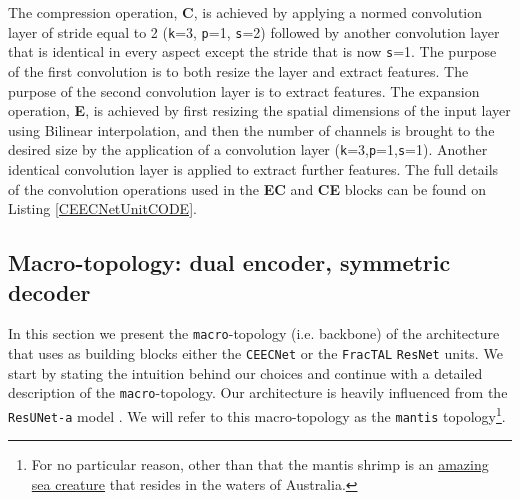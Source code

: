 \documentclass[times, 5p]{elsarticle}
\def \FracTAL {\texttt{FracTAL} }
\newcommand{\ceecnet}{\texttt{CEECNet}}
\begin{document}
The compression operation, \textbf{C}, is achieved by applying a normed convolution layer of stride equal to 2 (\texttt{k}=3, \texttt{p}=1, \texttt{s}=2) followed by another convolution layer that is identical in every aspect except the stride that is now \texttt{s}=1. The purpose of the first convolution is to both resize the layer and extract features. The purpose of the second  convolution layer is to extract features. The expansion operation, \textbf{E}, is achieved by first resizing the spatial dimensions of the input layer using Bilinear interpolation, and then the number of channels is brought to the desired size by the application of a convolution layer (\texttt{k}=3,\texttt{p}=1,\texttt{s}=1). Another identical convolution layer is applied to extract further features. The full details of the convolution operations used in the \textbf{EC} and \textbf{CE} blocks  can be found on Listing \ref{CEECNetUnitCODE}.


\subsection{Macro-topology: dual encoder, symmetric decoder}
\label{the_mantis_section}

In this section we present the \texttt{macro}-topology (i.e. backbone) of the  architecture that uses as building blocks either the \ceecnet{} or the \FracTAL \texttt{ResNet} units. We start by stating the intuition behind our choices and continue with a detailed description of the \texttt{macro}-topology. Our architecture is heavily influenced from the \texttt{ResUNet-a} model \citep{DIAKOGIANNIS202094}. We will refer to this macro-topology as the \texttt{mantis} topology\footnote{For no particular reason, other than that the mantis shrimp is an \href{https://theoatmeal.com/comics/mantis_shrimp}{amazing sea creature} that resides in the waters of Australia.}. 
\end{document}
